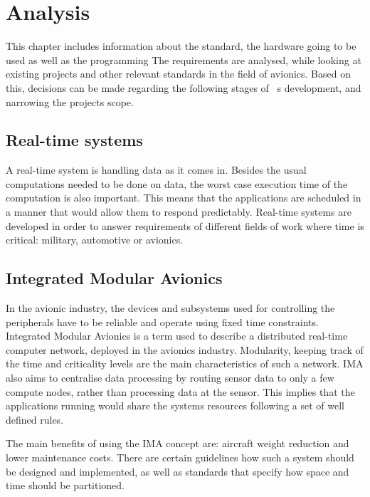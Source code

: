 
\chapter{Analysis}\label{chap:analysis}
This chapter includes information about
the standard, the hardware going to be used as well as the programming
The \arinc{} requirements are analysed, while looking at existing projects
and other relevant standards in the field of avionics. Based on this,
decisions can be made regarding the following stages of \OSname\ \textquotesingle s
development, and narrowing the project\textquotesingle s
scope.

\section{Real-time systems}
A real-time system is handling data as it comes in.
Besides the usual computations needed to be done on data,
the worst case execution time of the computation is also important.
This means that the applications are scheduled in a manner
that would allow them to respond predictably.
Real-time systems are developed in order to answer
requirements of different fields of work
where time is critical: military, automotive or avionics.

\section{Integrated Modular Avionics}
In the avionic industry, the devices and subsystems used for
controlling the peripherals have to be reliable and operate using
fixed time constraints. Integrated Modular Avionics is a term used
to describe a distributed real-time computer network,
deployed in the avionics industry\cite{ima_description}.
Modularity, keeping track of the time and criticality levels are
the main characteristics of such a network. IMA also aims to centralise data 
processing by routing sensor data to only a few compute nodes, rather than
processing data at the sensor. This implies that the applications running would 
share the system\textquotesingle s resources following a set of well defined 
rules.

The main benefits of using the IMA concept are: aircraft weight reduction\cite{boeing_weight_reduction}
and lower maintenance costs\cite{arinc_scarlett}.
There are certain guidelines how such a system
should be designed and implemented, as well as standards that specify
how space and time should be partitioned.

